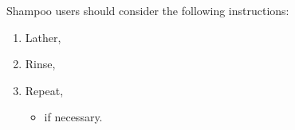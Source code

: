 \documentclass{article}
\begin{document}
\fontsize{40}{50}\selectfont 

Shampoo users should consider 
the following instructions:
\begin{enumerate}
\item Lather,
\item Rinse,
\item Repeat,
    \begin{itemize}
     \item{if necessary.}
    \end{itemize}
\end{enumerate}
\end{document}
